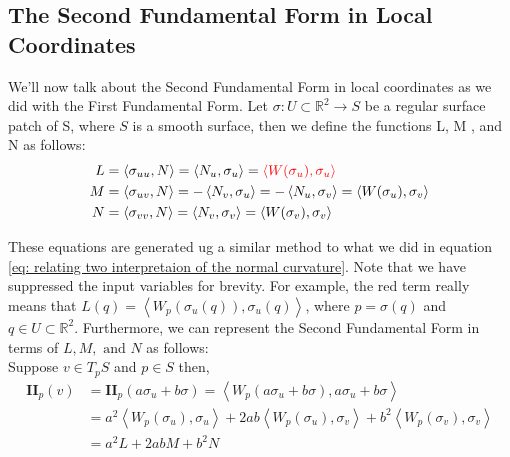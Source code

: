 \documentclass{article}
\theoremstyle{plain}
\theoremstyle{definition}
\theoremstyle{remark}
\newcommand{\R}{\mathbb{R}}
\begin{document}
\subsection{The Second Fundamental Form in Local Coordinates}
We'll now talk about the Second Fundamental Form in local coordinates as we did with the First Fundamental Form. Let \( \sigma: U \subset \R^2 \rightarrow S\) be a regular surface patch of S, where \(S\) is a smooth surface, then we define the functions L, M , and N as follows:
\begin{align} \label{eq: define second fundamental form in local coordinates}
    \begin{split}
        L & = \left\langle \sigma_{uu}, N\right\rangle = \left\langle N_u, \sigma_u\right\rangle = { \color{red}\left\langle W(\sigma_u), \sigma_u\right\rangle} \\
        M & = \left\langle \sigma_{uv}, N\right\rangle = - \left\langle N_v, \sigma_u\right\rangle = - \left\langle N_u, \sigma_v\right\rangle  = \left\langle W(\sigma_u), \sigma_v\right\rangle \\
        N & = \left\langle \sigma_{vv}, N\right\rangle = \left\langle N_v, \sigma_v\right\rangle = \left\langle W(\sigma_v), \sigma_v\right\rangle
    \end{split}
\end{align}

These equations are generated ug a similar method to what we did in equation \ref{eq: relating two interpretaion of the normal curvature}. Note that we have suppressed the input variables for brevity. For example, the red term really means that \( L(q) = \left\langle W_{p}(\sigma_u(q)), \sigma_u(q)\right\rangle \), where \(p = \sigma(q)\) and \(q \in U \subset \R^2\). Furthermore, we can represent the Second Fundamental Form in terms of \(L, M, \text{ and } N\) as follows:\\
Suppose \( v \in T_pS\) and \( p \in S\) then,
\begin{align*}
    \mathbf{II}_p(v) & = \mathbf{II}_p(a\sigma_u + b\sigma) = \left\langle W_p(a\sigma_u + b\sigma), a\sigma_u + b\sigma \right\rangle                                                        \\
                     & = a^2 \left\langle W_p(\sigma_u), \sigma_u\right\rangle + 2ab\left\langle W_p(\sigma_u), \sigma_v\right\rangle + b^2\left\langle W_p(\sigma_v), \sigma_v \right\rangle \\
                     & = a^2 L + 2ab M + b^2 N
\end{align*}
\end{document}
